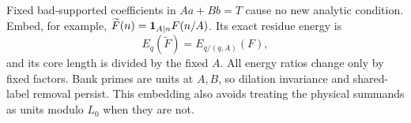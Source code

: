 Fixed bad-supported coefficients in \(Aa+Bb=T\) cause no new
analytic condition.  Embed, for example,
\(\widetilde F(n)=\mathbf 1_{A\mid n}F(n/A)\).
Its exact residue energy is
\[
                  E_q(\widetilde F)=E_{q/(q,A)}(F),
\]
and its core length is divided by the fixed \(A\).
All energy ratios change only by fixed factors.
Bank primes are units at \(A,B\), so dilation invariance and
shared-label removal persist.  This embedding also avoids treating
the physical summands as units modulo \(L_0\) when they are not.
